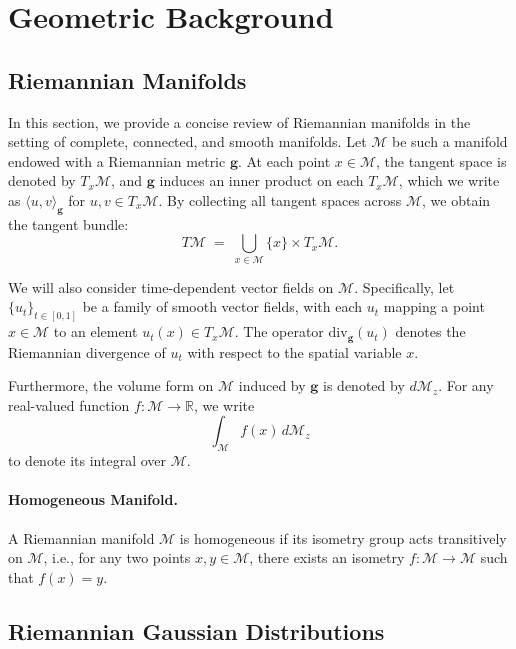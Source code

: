 \section{Geometric Background}\label{sec:app_background}

\subsection{Riemannian Manifolds}
\label{app:riemannian}

In this section, we provide a concise review of Riemannian manifolds in the setting of complete, connected, and smooth manifolds. Let $\mathcal{M}$ be such a manifold endowed with a Riemannian metric $\mathbf{g}$. At each point $x \in \mathcal{M}$, the tangent space is denoted by $T_x\mathcal{M}$, and $\mathbf{g}$ induces an inner product on each $T_x\mathcal{M}$, which we write as $\langle u, v \rangle_{\mathbf{g}}$ for $u, v \in T_x\mathcal{M}$. By collecting all tangent spaces across $\mathcal{M}$, we obtain the tangent bundle:
$$
T\mathcal{M} \;=\; \bigcup_{x \in \mathcal{M}} \{x\} \times T_x\mathcal{M}.
$$

We will also consider time-dependent vector fields on $\mathcal{M}$. Specifically, let $\{u_t\}_{t \in [0,1]}$ be a family of smooth vector fields, with each $u_t$ mapping a point $x \in \mathcal{M}$ to an element $u_t(x) \in T_x\mathcal{M}$. The operator $\mathrm{div}_{\mathbf{g}}(u_t)$ denotes the Riemannian divergence of $u_t$ with respect to the spatial variable $x$.

Furthermore, the volume form on $\mathcal{M}$ induced by $\mathbf{g}$ is denoted by $d\mathcal{M}_z$. For any real-valued function $f: \mathcal{M} \to \mathbb{R}$, we write
$$
\int_{\mathcal{M}} f(x)\, d\mathcal{M}_z
$$
to denote its integral over $\mathcal{M}$.

\paragraph{Homogeneous Manifold.} A Riemannian manifold $\mathcal{M}$ is homogeneous if its isometry group acts transitively on $\mathcal{M}$, i.e., for any two points $x,y\in\mathcal{M}$, there exists an isometry $f:\mathcal{M}\to\mathcal{M}$ such that $f(x)=y$.

\subsection{Riemannian Gaussian Distributions}\label{app:riem_gauss}

